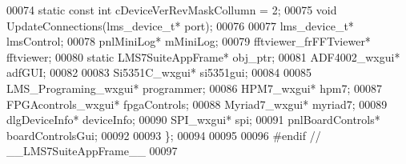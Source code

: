 \begin{DoxyCode}
00074         \textcolor{keyword}{static} \textcolor{keyword}{const} \textcolor{keywordtype}{int} cDeviceVerRevMaskCollumn = 2;
00075         \textcolor{keywordtype}{void} UpdateConnections(lms_device_t* port);
00076 
00077         lms_device_t* lmsControl;
00078         pnlMiniLog* mMiniLog;
00079         fftviewer_frFFTviewer* fftviewer;
00080         \textcolor{keyword}{static} LMS7SuiteAppFrame* obj_ptr;
00081         ADF4002_wxgui* adfGUI;
00082 
00083         Si5351C_wxgui* si5351gui;
00084 
00085         LMS_Programing_wxgui* programmer;
00086         HPM7_wxgui* hpm7;
00087         FPGAcontrols_wxgui* fpgaControls;
00088         Myriad7_wxgui* myriad7;
00089         dlgDeviceInfo* deviceInfo;
00090         SPI_wxgui* spi;
00091         pnlBoardControls* boardControlsGui;
00092 
00093 \};
00094 
00095 
00096 \textcolor{preprocessor}{#endif // \_\_LMS7SuiteAppFrame\_\_}
00097 
\end{DoxyCode}
